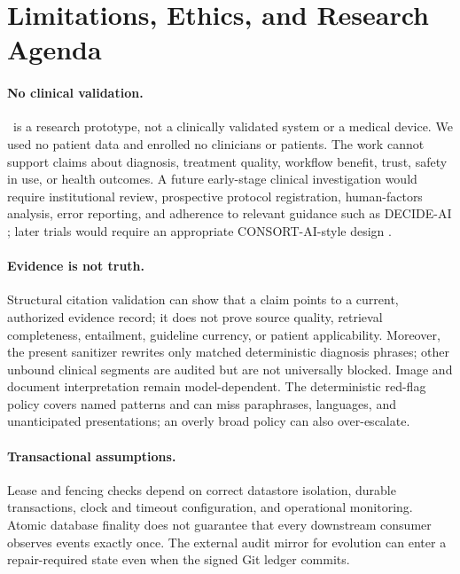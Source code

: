 \section{Limitations, Ethics, and Research Agenda}
\label{sec:limitations}

\paragraph{No clinical validation.}
\system\ is a research prototype, not a clinically validated system or a
medical device.  We used no patient data and enrolled no clinicians or
patients.  The work cannot support claims about diagnosis, treatment quality,
workflow benefit, trust, safety in use, or health outcomes.  A future
early-stage clinical investigation would require institutional review,
prospective protocol registration, human-factors analysis, error reporting,
and adherence to relevant guidance such as DECIDE-AI
\citep{vasey2022decide}; later trials would require an appropriate
CONSORT-AI-style design \citep{liu2020consortai}.

\paragraph{Evidence is not truth.}
Structural citation validation can show that a claim points to a current,
authorized evidence record; it does not prove source quality, retrieval
completeness, entailment, guideline currency, or patient applicability.
Moreover, the present sanitizer rewrites only matched deterministic diagnosis
phrases; other unbound clinical segments are audited but are not universally
blocked.
Image and document interpretation remain model-dependent.  The deterministic
red-flag policy covers named patterns and can miss paraphrases, languages, and
unanticipated presentations; an overly broad policy can also over-escalate.

\paragraph{Transactional assumptions.}
Lease and fencing checks depend on correct datastore isolation, durable
transactions, clock and timeout configuration, and operational monitoring.
Atomic database finality does not guarantee that every downstream consumer
observes events exactly once.  The external audit mirror for evolution can
enter a repair-required state even when the signed Git ledger commits.

